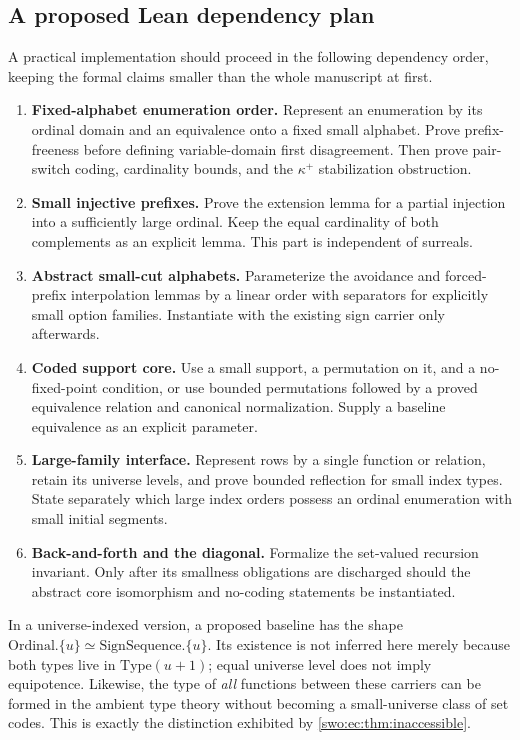 \documentclass[11pt]{article}
\theoremstyle{definition}
\theoremstyle{remark}
\begin{document}
\subsection{A proposed Lean dependency plan}
A practical implementation should proceed in the following dependency
order, keeping the formal claims smaller than the whole manuscript at
first.

\begin{enumerate}[label=\arabic*.]
\item \textbf{Fixed-alphabet enumeration order.} Represent an enumeration
by its ordinal domain and an equivalence onto a fixed small alphabet.
Prove prefix-freeness before defining variable-domain first disagreement.
Then prove pair-switch coding, cardinality bounds, and the
$\kappa^+$ stabilization obstruction.
\item \textbf{Small injective prefixes.} Prove the extension lemma for a
partial injection into a sufficiently large ordinal. Keep the equal
cardinality of both complements as an explicit lemma. This part is
independent of surreals.
\item \textbf{Abstract small-cut alphabets.} Parameterize the avoidance
and forced-prefix interpolation lemmas by a linear order with separators
for explicitly small option families. Instantiate with the existing
sign carrier only afterwards.
\item \textbf{Coded support core.} Use a small support, a permutation on
it, and a no-fixed-point condition, or use bounded permutations followed
by a proved equivalence relation and canonical normalization. Supply a
baseline equivalence as an explicit parameter.
\item \textbf{Large-family interface.} Represent rows by a single
function or relation, retain its universe levels, and prove bounded
reflection for small index types. State separately which large index
orders possess an ordinal enumeration with small initial segments.
\item \textbf{Back-and-forth and the diagonal.} Formalize the
set-valued recursion invariant. Only after its smallness obligations
are discharged should the abstract core isomorphism and no-coding
statements be instantiated.
\end{enumerate}

In a universe-indexed version, a proposed baseline has the shape
$\mathrm{Ordinal}.\{u\}\simeq\mathrm{SignSequence}.\{u\}$. Its existence
is not inferred here merely because both types live in
$\mathrm{Type}(u+1)$; equal universe level does not imply equipotence.
Likewise, the type of \emph{all} functions between these carriers can
be formed in the ambient type theory without becoming a small-universe
class of set codes. This is exactly the distinction exhibited by
\cref{swo:ec:thm:inaccessible}.
\end{document}
